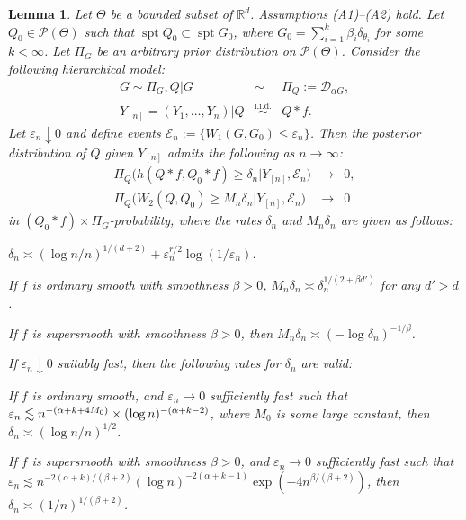 \documentclass[MSNbibl,number,citesort]{arxbj}
\newtheorem{lemma}{Lemma}[section]
\newcommand{\real}{\mathbb{R}}
\newcommand{\Ecal}{\mathcal{E}}
\newcommand{\Pcal}{\mathscr{P}}
\newcommand{\supp}{\operatorname{spt}}
\newcommand{\DP}{\mathscr{D}}
\newcommand{\YYn}{Y_{[n]}}
\begin{document}
\begin{lemma}
\label{Thm-perturb}
Let $\Theta$ be a bounded subset of $\real^d$.
Assumptions \textup{(A1)--(A2)} hold.
Let $Q_0 \in\Pcal(\Theta)$ such that $\supp Q_0 \subset\supp G_0$,
where $G_0 = \sum_{i=1}^{k}\beta_i \delta_{\theta_i}$ for some $k
<\infty$.
Let $\Pi_G$ be an arbitrary prior distribution on $\Pcal(\Theta)$.
Consider the following hierarchical model:
%
\begin{eqnarray*}
G \sim\Pi_G, Q|G &\sim& \Pi_Q :=
\DP_{\alpha G},
\\
\YYn= (Y_1,\ldots, Y_n)| Q & \stackrel{\mathrm{i.i.d.}} {\sim} &
Q*f.
\end{eqnarray*}
%
Let $\varepsilon_n \downarrow0$ and define
events $\Ecal_n:= \{W_1(G,G_0) \leq\varepsilon_n\}$.
Then the posterior distribution of $Q$ given $\YYn$
admits the following as $n\rightarrow\infty$:
%
%
\begin{eqnarray}
\label{Eqn-conv-1} \Pi_{Q} \bigl(h(Q*f,Q_0*f)\geq
\delta_{n} | \YYn, \Ecal_n \bigr) &\rightarrow&0,
\\
\label{Eqn-conv-2} \Pi_{Q} \bigl(W_2(Q,Q_0)\geq
M_n\delta_{n} | \YYn, \Ecal_n \bigr)
&\rightarrow& 0
\end{eqnarray}
%
in $(Q_0*f) \times\Pi_G$-probability, where the rates $\delta_n$
and $M_n\delta_n$ are given as follows:
%
\begin{longlist}[(iii)]
%
\item[(i)] $\delta_n \asymp(\log n/n)^{1/(d+2)}+ \varepsilon
_n^{r/2}\log
(1/\varepsilon_n)$.
%
\item[(ii)] If $f$ is ordinary smooth with smoothness $\beta> 0$,
$M_n\delta_n \asymp\delta_n^{{1}/{(2+\beta d')}}$ for any $d'>d$.
%
\item[(iii)] If $f$ is supersmooth with smoothness $\beta> 0$, then
$M_n \delta_n \asymp(-\log\delta_n)^{-1/\beta}$.
\end{longlist}
%
If $\varepsilon_n \downarrow0$ suitably fast, then the following
rates for $\delta_n$ are valid:
%
\begin{longlist}[(iii)]
%
\item[(iv)] If $f$ is ordinary smooth,
and $\varepsilon_n \rightarrow0$ sufficiently fast such that
$\varepsilon_n \lesssim n^{-(\alpha+k+4M_0)}\times\break   (\log n)^{-(\alpha
+k-2)}$, where
$M_0$ is some large constant,
then $\delta_n \asymp(\log n/n)^{1/2}$.

\item[(v)] If $f$ is supersmooth with smoothness $\beta> 0$,
and $\varepsilon_n \rightarrow0$ sufficiently fast such that
$\varepsilon_n \lesssim n^{-2(\alpha+k)/(\beta+2)} (\log
n)^{-2(\alpha+k-1)}
\exp(-4n^{\beta/(\beta+2)})$,
then $\delta_n \asymp(1/n)^{1/(\beta+2)}$.
\end{longlist}
%
\end{lemma}
\end{document}
